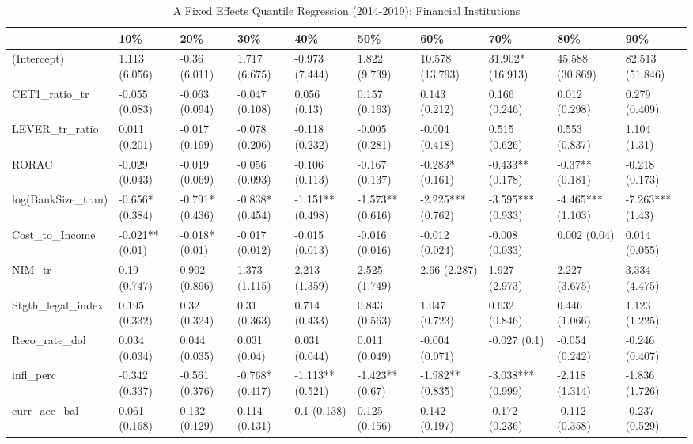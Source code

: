\begin{table}[ht]
\centering
\caption{A Fixed Effects Quantile Regression (2014-2019): Financial Institutions} 
\begingroup\small
\begin{tabular}{llllllllll}
  \toprule
 & 10\% & 20\% & 30\% & 40\% & 50\% & 60\% & 70\% & 80\% & 90\% \\ 
  \midrule
(Intercept) & 1.113 (6.056) & -0.36 (6.011) & 1.717 (6.675) & -0.973 (7.444) & 1.822 (9.739) & 10.578 (13.793) & 31.902* (16.913) & 45.588 (30.869) & 82.513 (51.846) \\ 
  CET1\_ratio\_tr & -0.055 (0.083) & -0.063 (0.094) & -0.047 (0.108) & 0.056 (0.13) & 0.157 (0.163) & 0.143 (0.212) & 0.166 (0.246) & 0.012 (0.298) & 0.279 (0.409) \\ 
  LEVER\_tr\_ratio & 0.011 (0.201) & -0.017 (0.199) & -0.078 (0.206) & -0.118 (0.232) & -0.005 (0.281) & -0.004 (0.418) & 0.515 (0.626) & 0.553 (0.837) & 1.104 (1.31) \\ 
  RORAC & -0.029 (0.043) & -0.019 (0.069) & -0.056 (0.093) & -0.106 (0.113) & -0.167 (0.137) & -0.283* (0.161) & -0.433** (0.178) & -0.37** (0.181) & -0.218 (0.173) \\ 
  log(BankSize\_tran) & -0.656* (0.384) & -0.791* (0.436) & -0.838* (0.454) & -1.151** (0.498) & -1.573** (0.616) & -2.225*** (0.762) & -3.595*** (0.933) & -4.465*** (1.103) & -7.263*** (1.43) \\ 
  Cost\_to\_Income & -0.021** (0.01) & -0.018* (0.01) & -0.017 (0.012) & -0.015 (0.013) & -0.016 (0.016) & -0.012 (0.024) & -0.008 (0.033) & 0.002 (0.04) & 0.014 (0.055) \\ 
  NIM\_tr & 0.19 (0.747) & 0.902 (0.896) & 1.373 (1.115) & 2.213 (1.359) & 2.525 (1.749) & 2.66 (2.287) & 1.927 (2.973) & 2.227 (3.675) & 3.334 (4.475) \\ 
  Stgth\_legal\_index & 0.195 (0.332) & 0.32 (0.324) & 0.31 (0.363) & 0.714 (0.433) & 0.843 (0.563) & 1.047 (0.723) & 0.632 (0.846) & 0.446 (1.066) & 1.123 (1.225) \\ 
  Reco\_rate\_dol & 0.034 (0.034) & 0.044 (0.035) & 0.031 (0.04) & 0.031 (0.044) & 0.011 (0.049) & -0.004 (0.071) & -0.027 (0.1) & -0.054 (0.242) & -0.246 (0.407) \\ 
  infl\_perc & -0.342 (0.337) & -0.561 (0.376) & -0.768* (0.417) & -1.113** (0.521) & -1.423** (0.67) & -1.982** (0.835) & -3.038*** (0.999) & -2.118 (1.314) & -1.836 (1.726) \\ 
  curr\_acc\_bal & 0.061 (0.168) & 0.132 (0.129) & 0.114 (0.131) & 0.1 (0.138) & 0.125 (0.156) & 0.142 (0.197) & -0.172 (0.236) & -0.112 (0.358) & -0.237 (0.529) \\ 

\end{tabular}
\end{table}

